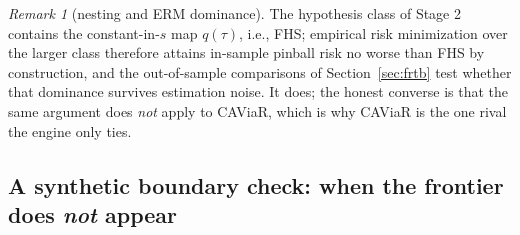 \documentclass[11pt]{article}
\theoremstyle{remark}
\newtheorem{remark}{Remark}
\begin{document}
\begin{remark}[nesting and ERM dominance]\label{rem:nesting}
The hypothesis class of Stage 2 contains the constant-in-$s$ map
$q(\tau)$, i.e., FHS; empirical risk minimization over the larger class
therefore attains in-sample pinball risk no worse than FHS by
construction, and the out-of-sample comparisons of
Section~\ref{sec:frtb} test whether that dominance survives estimation
noise. It does; the honest converse is that the same argument does
\emph{not} apply to CAViaR, which is why CAViaR is the one rival the
engine only ties.
\end{remark}

\subsection{A synthetic boundary check: when the frontier does
\emph{not} appear}\label{sec:toy}
\end{document}
